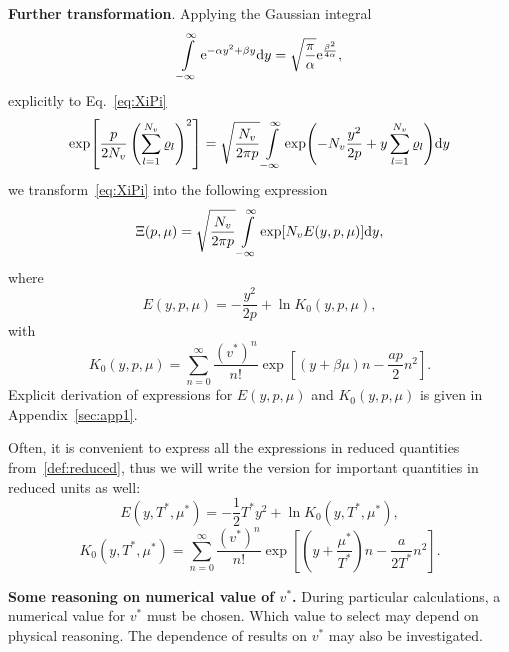 \documentclass[12pt]{article}
\numberwithin{equation}{section}
\begin{document}
	\textbf{Further transformation}. Applying the Gaussian integral
	\begin{equation}
		\int\limits_{-\infty}^{\infty} {\rm e}^{-\alpha y^2 + \beta y} {\rm d}y = \sqrt{\frac{\pi}{\alpha}} {\rm e}^{\frac{\beta^2}{4\alpha}},
	\end{equation}
	explicitly to Eq.~\eqref{eq:XiPi}
	\begin{equation}
		\label{eq:gaussInt}
		\exp[\frac{p}{2N_v}\left(\sum_{l=1}^{N_v} \varrho_l\right)^2] = \sqrt{\frac{N_v}{2\pi p}}
		\int\limits_{-\infty}^{\infty} \exp(-N_v \frac{y^2}{2p} + y\sum_{l=1}^{N_v} \varrho_l) {\rm d}y
	\end{equation}
	we transform~\eqref{eq:XiPi} into the following expression
	\begin{equation}
		\label{eq:XiInty}
		\Xi (p, \mu) = \sqrt{\frac{N_v}{2\pi p}} \int\limits_{-\infty}^{\infty} \exp[N_v E(y, p, \mu)] {\rm d} y,
	\end{equation}
	where 
	\begin{equation}
		\label{def:E}
		E(y,p,\mu) = -\frac{y^2}{2p} + \ln K_0(y,p,\mu),
	\end{equation}
	with
	\begin{equation}
		\label{def:K}
		K_0(y,p,\mu) = \sum_{n=0}^{\infty} \frac{(v^*)^n}{n!} \exp[(y+\beta\mu)n - \frac{ap}{2}n^2].
	\end{equation}
	Explicit derivation of expressions for $E(y,p,\mu)$ and $K_0(y,p,\mu)$ is given in Appendix~\ref{sec:app1}.
	
	\begin{mdframed}[linecolor=black,linewidth=1pt,leftline=true]
	Often, it is convenient to express all the expressions in reduced quantities from~\eqref{def:reduced}, thus we will write the version for important quantities in reduced units as well:
	\begin{equation}
		\label{def:reducedE}
		E(y,T^*,\mu^*) = -\frac{1}{2}T^* y^2 + \ln K_0(y, T^*, \mu^*),
	\end{equation}
	\begin{equation}
		K_0(y,T^*,\mu^*) = \sum_{n=0}^{\infty} \frac{(v^*)^n}{n!} \exp[\left(y+\frac{\mu^*}{T^*}\right)n - \frac{a}{2T^*}n^2].
	\end{equation}
	\end{mdframed}
	
	\textbf{Some reasoning on numerical value of $v^*$.} During particular calculations, a numerical value for $v^*$ must be chosen. Which value to select may depend on physical reasoning. The dependence of results on $v^*$ may also be investigated.
	
\end{document}
